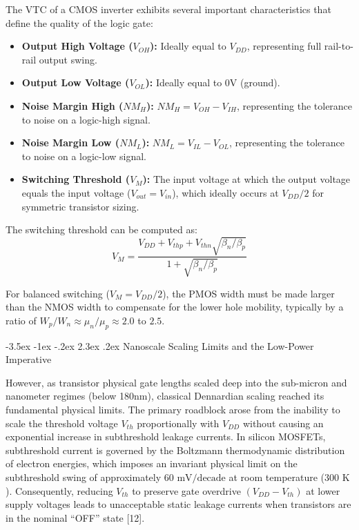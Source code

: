 \documentclass[12pt,a4paper,oneside]{report}
\makeatletter
\renewcommand\section{\@startsection {section}{1}{\z@}%
                                   {-3.5ex \@plus -1ex \@minus -.2ex}%
                                   {2.3ex \@plus.2ex}%
                                   {\normalfont\normalsize\bfseries}}
\makeatother
\begin{document}
The VTC of a CMOS inverter exhibits several important characteristics that define the quality of the logic gate:
\begin{itemize}
\item \textbf{Output High Voltage ($V_{OH}$):} Ideally equal to $V_{DD}$, representing full rail-to-rail output swing.
\item \textbf{Output Low Voltage ($V_{OL}$):} Ideally equal to $0\text{V}$ (ground).
\item \textbf{Noise Margin High ($NM_H$):} $NM_H = V_{OH} - V_{IH}$, representing the tolerance to noise on a logic-high signal.
\item \textbf{Noise Margin Low ($NM_L$):} $NM_L = V_{IL} - V_{OL}$, representing the tolerance to noise on a logic-low signal.
\item \textbf{Switching Threshold ($V_M$):} The input voltage at which the output voltage equals the input voltage ($V_{out} = V_{in}$), which ideally occurs at $V_{DD}/2$ for symmetric transistor sizing.
\end{itemize}

The switching threshold can be computed as:
\begin{equation}
V_M = \frac{V_{DD} + V_{thp} + V_{thn}\sqrt{\beta_n/\beta_p}}{1 + \sqrt{\beta_n/\beta_p}}
\label{eq:switching_threshold}
\end{equation}

For balanced switching ($V_M = V_{DD}/2$), the PMOS width must be made larger than the NMOS width to compensate for the lower hole mobility, typically by a ratio of $W_p/W_n \approx \mu_n/\mu_p \approx 2.0$ to $2.5$.

\section{Nanoscale Scaling Limits and the Low-Power Imperative}

However, as transistor physical gate lengths scaled deep into the sub-micron and nanometer regimes (below 180nm), classical Dennardian scaling reached its fundamental physical limits. The primary roadblock arose from the inability to scale the threshold voltage $V_{th}$ proportionally with $V_{DD}$ without causing an exponential increase in subthreshold leakage currents. In silicon MOSFETs, subthreshold current is governed by the Boltzmann thermodynamic distribution of electron energies, which imposes an invariant physical limit on the subthreshold swing of approximately $60\text{ mV/decade}$ at room temperature ($300\text{ K}$). Consequently, reducing $V_{th}$ to preserve gate overdrive $(V_{DD} - V_{th})$ at lower supply voltages leads to unacceptable static leakage currents when transistors are in the nominal ``OFF'' state [12].
\end{document}
